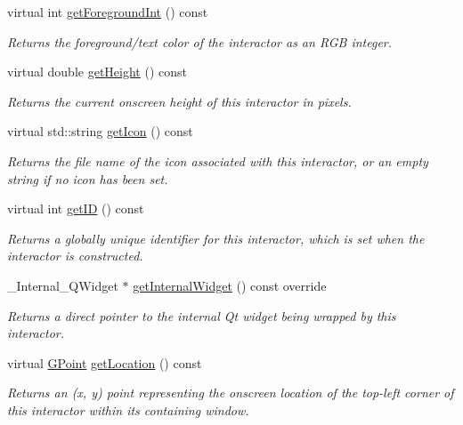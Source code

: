 \begin{DoxyCompactItemize}
virtual int \mbox{\hyperlink{classGInteractor_ac3b12ab385a6ef9ae90fc879860ba726}{get\+Foreground\+Int}} () const
\begin{DoxyCompactList}\small\item\em Returns the foreground/text color of the interactor as an R\+GB integer. \end{DoxyCompactList}\item 
virtual double \mbox{\hyperlink{classGInteractor_a1e7e353362434072875264cf95629f99}{get\+Height}} () const
\begin{DoxyCompactList}\small\item\em Returns the current onscreen height of this interactor in pixels. \end{DoxyCompactList}\item 
virtual std\+::string \mbox{\hyperlink{classGInteractor_aaed62a73004939a64da6f0eb9eb64d73}{get\+Icon}} () const
\begin{DoxyCompactList}\small\item\em Returns the file name of the icon associated with this interactor, or an empty string if no icon has been set. \end{DoxyCompactList}\item 
virtual int \mbox{\hyperlink{classGInteractor_a9c9659a6c6ba66b4107ba59c95a24241}{get\+ID}} () const
\begin{DoxyCompactList}\small\item\em Returns a globally unique identifier for this interactor, which is set when the interactor is constructed. \end{DoxyCompactList}\item 
\+\_\+\+Internal\+\_\+\+Q\+Widget $\ast$ \mbox{\hyperlink{classGBrowserPane_a2f6b36b2517087dc90a366b5ce1f5323}{get\+Internal\+Widget}} () const override
\begin{DoxyCompactList}\small\item\em Returns a direct pointer to the internal Qt widget being wrapped by this interactor. \end{DoxyCompactList}\item 
virtual \mbox{\hyperlink{structGPoint}{G\+Point}} \mbox{\hyperlink{classGInteractor_a4f83802015511edeb63b892830812c11}{get\+Location}} () const
\begin{DoxyCompactList}\small\item\em Returns an (x, y) point representing the onscreen location of the top-\/left corner of this interactor within its containing window. \end{DoxyCompactList}\item 

\end{DoxyCompactItemize}
